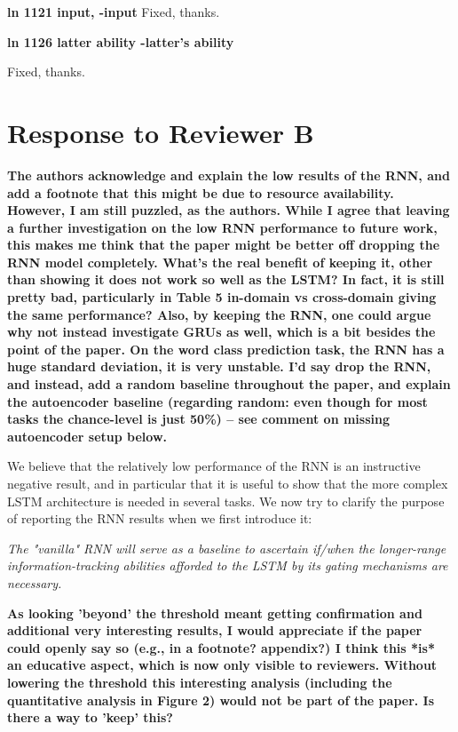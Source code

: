\documentclass{article}[11pt,a4paper,oneside]
\begin{document}
\textbf{ln 1121 input, -input}
Fixed, thanks.\newline

\textbf{ln 1126 latter ability -latter's ability}

Fixed, thanks.

\section{Response to Reviewer B}

\textbf{The authors acknowledge and explain the low results of the RNN, and add a
footnote that this might be due to resource availability. However, I am
still puzzled, as the authors. While I agree that leaving a further
investigation on the low RNN performance to future work, this makes me think
that the paper might be better off dropping the RNN model completely. What's
the real benefit of keeping it, other than showing it does not work so well
as the LSTM? In fact, it is still pretty bad, particularly in Table 5 in-domain vs
cross-domain giving the same performance? Also, by keeping the RNN, one
could argue why not instead investigate GRUs as well, which is a bit besides
the point of the paper. On the word class prediction task, the RNN has a
huge standard deviation, it is very unstable. I'd say drop the RNN, and
instead, add a random baseline throughout the paper, and explain the
autoencoder baseline (regarding random: even though for most tasks the
chance-level is just 50\%) -- see comment on missing autoencoder setup below.}

We believe that the relatively low performance of the RNN is an instructive negative result, and in particular that it is useful to show that the more complex LSTM architecture is needed in several tasks. We now try to clarify the purpose of reporting the RNN results when we first introduce it:

\textit{The "vanilla" RNN will serve as a baseline  to ascertain if/when the longer-range information-tracking abilities afforded to the LSTM by its gating mechanisms are necessary.}\newline

\textbf{As looking 'beyond' the threshold meant getting confirmation and additional
very interesting results, I would appreciate if the paper could openly say
so (e.g., in a footnote? appendix?)  I think this *is* an educative aspect,
which is now only visible to reviewers. Without lowering the threshold this
interesting analysis (including the quantitative analysis in Figure 2) would
not be part of the paper. Is there a way to 'keep' this?}
\end{document}
